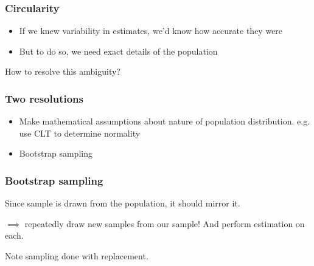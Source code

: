\documentclass[handout]{beamer}
\begin{document}
\begin{frame}
	\frametitle{Circularity}
	
	\begin{itemize}
		\item If we knew variability in estimates, we'd know how accurate they were
		\item But to do so, we need exact details of the population
	\end{itemize}
	
	How to resolve this ambiguity?
	
\end{frame}

\begin{frame}
	\frametitle{Two resolutions}
	
	\begin{itemize}
		\item Make mathematical assumptions about nature of population distribution. e.g. use CLT to determine normality
		\item Bootstrap sampling
	\end{itemize}
	
\end{frame}

\begin{frame}
	\frametitle{Bootstrap sampling}
	
	Since sample is drawn from the population, it should mirror it.
	
	\vspace{0.5cm}
	
	$\implies$ repeatedly draw new samples from our sample! And perform estimation on each.

	\vspace{0.5cm}
	
	Note sampling done with replacement.
	
\end{frame}
\end{document}
